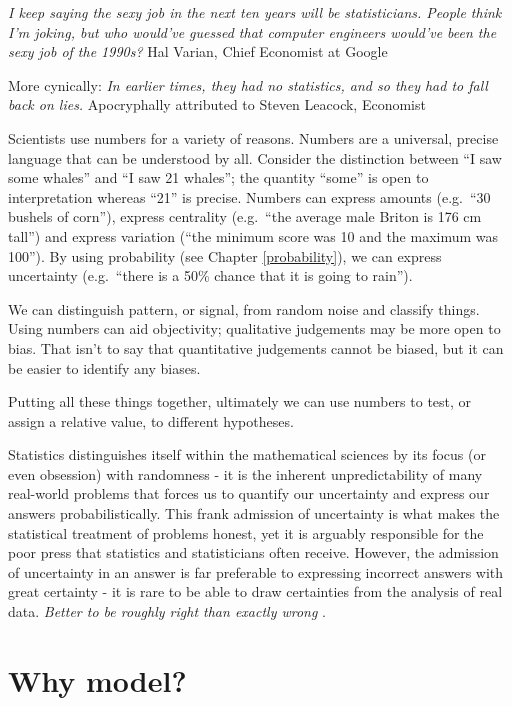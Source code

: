 \documentclass[
  oneside]{krantz}
\begin{document}
\emph{I keep saying the sexy job in the next ten years will be statisticians. People think I'm joking, but who would've guessed that computer engineers would've been the sexy job of the 1990s?}
Hal Varian, Chief Economist at Google \citep{Varian1}

More cynically:
\emph{In earlier times, they had no statistics, and so they had to fall back on lies.}
Apocryphally attributed to Steven Leacock, Economist

Scientists use numbers for a variety of reasons. Numbers are a universal, precise language that can be understood by all. Consider the distinction between ``I saw some whales'' and ``I saw 21 whales''; the quantity ``some'' is open to interpretation whereas ``21'' is precise. Numbers can express amounts (e.g.~``30 bushels of corn''), express centrality (e.g.~``the average male Briton is 176 cm tall'') and express variation (``the minimum score was 10 and the maximum was 100''). By using probability (see Chapter \ref{probability}), we can express uncertainty (e.g.~``there is a 50\% chance that it is going to rain'').

We can distinguish pattern, or signal, from random noise and classify things. Using numbers can aid objectivity; qualitative judgements may be more open to bias. That isn't to say that quantitative judgements cannot be biased, but it can be easier to identify any biases.

Putting all these things together, ultimately we can use numbers to test, or assign a relative value, to different hypotheses.

Statistics distinguishes itself within the mathematical sciences by its focus (or even obsession) with randomness - it is the inherent unpredictability of many real-world problems that forces us to quantify our uncertainty and express our answers probabilistically. This frank admission of uncertainty is what makes the statistical treatment of problems honest, yet it is arguably responsible for the poor press that statistics and statisticians often receive. However, the admission of uncertainty in an answer is far preferable to expressing incorrect answers with great certainty - it is rare to be able to draw certainties from the analysis of real data. \emph{Better to be roughly right than exactly wrong} \citep{Fingland2011}.

\hypertarget{why-model}{%
\section{Why model?}\label{why-model}}
\end{document}
